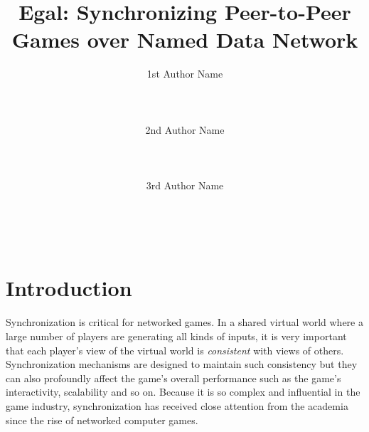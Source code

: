 \documentclass{sigchi}
\begin{document}
\title{Egal: Synchronizing Peer-to-Peer Games over Named Data Network}

\author{
  \alignauthor 1st Author Name\\
    \\
    \\
    \\
  \alignauthor 2nd Author Name\\
    \\
    \\
    \\
  \alignauthor 3rd Author Name\\
    \\
    \\
    \\
}


\maketitle


\begin{abstract}
%

\end{abstract}

\keywords{}





\section{Introduction}
\label{introduction}

Synchronization is critical for networked games. In a shared virtual world where a large number of players are generating all kinds of inputs, it is very important that each player's view of the virtual world is \emph{consistent} with views of others. Synchronization mechanisms are designed to maintain such consistency but they can also profoundly affect the game's overall performance such as  the game's interactivity, scalability and so on. Because it is so complex and influential in the game industry, synchronization has received close attention from the academia since the rise of networked computer games.
\end{document}
